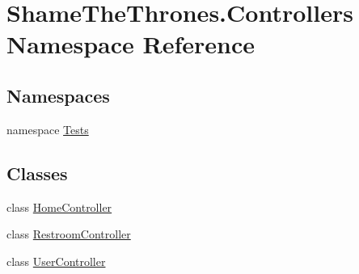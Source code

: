 \hypertarget{namespace_shame_the_thrones_1_1_controllers}{}\section{Shame\+The\+Thrones.\+Controllers Namespace Reference}
\label{namespace_shame_the_thrones_1_1_controllers}
\subsection*{Namespaces}
\begin{DoxyCompactItemize}
\item 
namespace \hyperlink{namespace_shame_the_thrones_1_1_controllers_1_1_tests}{Tests}
\end{DoxyCompactItemize}
\subsection*{Classes}
\begin{DoxyCompactItemize}
\item 
class \hyperlink{class_shame_the_thrones_1_1_controllers_1_1_home_controller}{Home\+Controller}
\item 
class \hyperlink{class_shame_the_thrones_1_1_controllers_1_1_restroom_controller}{Restroom\+Controller}
\item 
class \hyperlink{class_shame_the_thrones_1_1_controllers_1_1_user_controller}{User\+Controller}
\end{DoxyCompactItemize}
